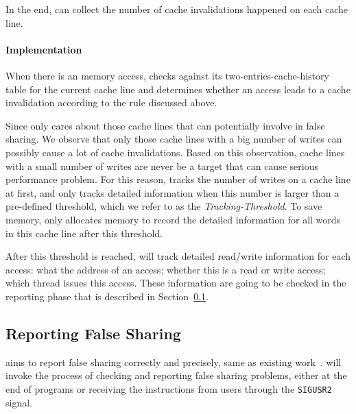       
In the end, \cheetah{} can collect the number of cache invalidations happened on each cache line. 

\paragraph{Implementation} 

When there is an memory access, \Cheetah{} checks against its two-entries-cache-history table for the current cache line and determines whether an access leads to a cache invalidation according to the rule discussed above. 

Since \cheetah{} only cares about those cache lines that can potentially involve in false sharing. We observe that only those cache lines with a big number of writes can possibly cause a lot of cache invalidations. Based on this observation, cache lines with a small number of writes are never be a target that can cause serious performance problem. For this reason, \Cheetah{} tracks  the number of writes on a cache line at first, and only tracks detailed information when this number is larger than a pre-defined threshold, which we refer to as the {\it Tracking-Threshold}. To save memory, \cheetah{} only allocates memory to record the detailed information for all words in this cache line after this threshold.
 
After this threshold is reached, \Cheetah{} will track detailed read/write information for each access: what the address of an access; whether this is a read or write access; which thread issues this access. These information are going to be checked in the reporting phase that is described in Section~\ref{sec:report}. 

 \subsection{Reporting False Sharing}
\label{sec:report}

\Cheetah{} aims to report false sharing correctly and precisely, same as existing work~\cite{Sheriff, Predator}. \Cheetah{} will invoke the process of checking and reporting false sharing problems, either at the end of programs or receiving the instructions from users through the \texttt{SIGUSR2} signal.  


